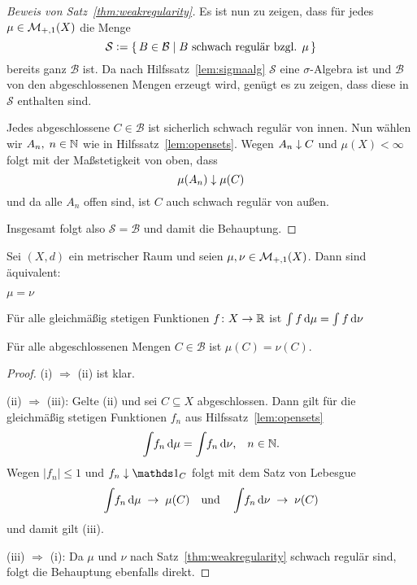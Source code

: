 \documentclass[../main/main.tex]{subfiles}
\begin{document}
	\begin{proof}[Beweis von Satz~\ref{thm:weakregularity}]
		Es ist nun zu zeigen, dass für jedes $\mu \in \mathcal{M}_{+,1}(X)$
		die Menge 
		$$\mathcal{S} \vcentcolon = \left\{\, B \in \mathcal{B} \; | \; B \text{ schwach regulär bzgl. } \mu \,\right\}$$
		bereits ganz $\mathcal{B}$ ist. 
		Da nach Hilfssatz~\ref{lem:sigmaalg} $\mathcal{S}$ eine $\sigma$-Algebra ist und $\mathcal{B}$ von den abgeschlossenen Mengen erzeugt wird, genügt es zu zeigen, dass diese in $\mathcal{S}$
		enthalten sind. 
		
		Jedes abgeschlossene $C \in \mathcal{B}$ ist sicherlich schwach regulär von innen. Nun wählen wir $A_n, \; n \in \mathbb{N}$ wie in Hilfssatz~\ref{lem:opensets}. Wegen $A_n \downarrow C$ und $\mu(X) < \infty$
		folgt mit der Maßstetigkeit von oben, dass
		$$\mu(A_n) \downarrow \mu(C)$$
		und da alle $A_n$ offen sind, ist $C$ auch schwach regulär von außen.
		
		Insgesamt folgt also $\mathcal{S} = \mathcal{B}$ und damit die Behauptung.
	\end{proof}

	\begin{Satz}
		Sei $(X,d)$ ein metrischer Raum und seien $\mu, \nu \in \mathcal{M}_{+,1}(X)$. Dann sind äquivalent:
		\begin{equivalentthm}
			\item $\mu = \nu$
			\item Für alle gleichmäßig stetigen Funktionen $f \colon X \to \mathbb{R}$ ist $\int_{} \, f \, \mathrm{d}\mu = \int_{} \, f \, \mathrm{d}\nu$
			\item Für alle abgeschlossenen Mengen $C \in \mathcal{B}$ ist $\mu(C) = \nu(C)$.
		\end{equivalentthm}
	\end{Satz}

	\begin{proof}
		(i) $\Rightarrow$ (ii) ist klar.
		
		(ii) $\Rightarrow$ (iii): Gelte (ii) und sei $C \subseteq X$ abgeschlossen. Dann gilt für die gleichmäßig stetigen Funktionen $f_n$ aus Hilfssatz~\ref{lem:opensets}
		$$\int_{} \, f_n \, \mathrm{d}\mu = \int_{} \, f_n \, \mathrm{d}\nu\text{,} \quad n \in \mathbb{N} \text{.}$$
		Wegen $| f_n | \leq 1$ und $f_n \convdown \indfct_C$ folgt mit dem Satz von Lebesgue 
		$$\int_{} \, f_n \, \mathrm{d}\mu \; \to \; \mu(C) \quad \text{und} \quad \int_{} \, f_n \, \mathrm{d}\nu \; \to \; \nu(C)$$
		und damit gilt (iii).
		
		(iii) $\Rightarrow$ (i): Da $\mu$ und $\nu$ nach Satz~\ref{thm:weakregularity} schwach regulär sind, folgt die Behauptung ebenfalls direkt.
	\end{proof}
\end{document}
